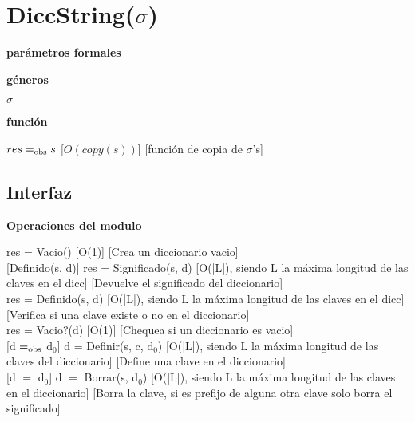\section{DiccString($\sigma$)}

\textbf{parámetros formales}\parindent\\
\parbox{1.7cm}{\textbf{géneros}}  $\sigma$\\
\parbox[t]{1.7cm}{\textbf{función}}\parbox[t]{\textwidth-2\parindent-1.7cm}{%
{$res =_{\mathrm{obs}} s$}
[$O(copy(s))$]
[función de copia de $\sigma$'s]
}

\subsection{Interfaz}

\bf{Operaciones del modulo}

{res = Vacio()}
[O(1)]
[Crea un diccionario vacio]\\

[Definido(s, d)]
{res = Significado(s, d)}
[O(|L|), siendo L la máxima longitud de las claves en el dicc]
[Devuelve el significado del diccionario]\\

{res = Definido(s, d)}
[O(|L|), siendo L la máxima longitud de las claves en el dicc]
[Verifica si una clave existe o no en el diccionario]\\

{res = Vacio?(d)}
[O(1)]
[Chequea si un diccionario es vacio]\\

[d $=_{\mathrm{obs}}$ d$_0$]
{d = Definir(s, c, d$_0$)}
[O(|L|), siendo L la máxima longitud de las claves del diccionario]
[Define una clave en el diccionario]\\

[d $=$ d$_0$]
{d $=$ Borrar(s, d$_0$)}
[O(|L|), siendo L la máxima longitud de las claves en el diccionario]
[Borra la clave, si es prefijo de alguna otra clave solo borra el significado]\\

